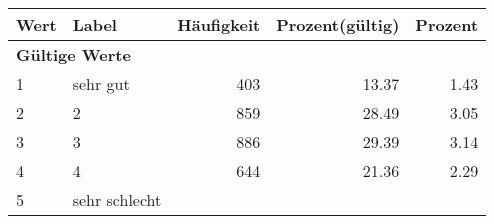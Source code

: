      \begin{longtable}{lXrrr}
     \toprule
     \textbf{Wert} & \textbf{Label} & \textbf{Häufigkeit} & \textbf{Prozent(gültig)} & \textbf{Prozent} \\
     \endhead
     \midrule
     \multicolumn{5}{l}{\textbf{Gültige Werte}}\\

     1 &
     \multicolumn{1}{X}{ sehr gut   } &


       \num{403} &
       \num[round-mode=places,round-precision=2]{13.37} &
         \num[round-mode=places,round-precision=2]{1.43} \\

     2 &
     \multicolumn{1}{X}{ 2   } &


       \num{859} &
       \num[round-mode=places,round-precision=2]{28.49} &
         \num[round-mode=places,round-precision=2]{3.05} \\

     3 &
     \multicolumn{1}{X}{ 3   } &


       \num{886} &
       \num[round-mode=places,round-precision=2]{29.39} &
         \num[round-mode=places,round-precision=2]{3.14} \\

     4 &
     \multicolumn{1}{X}{ 4   } &


       \num{644} &
       \num[round-mode=places,round-precision=2]{21.36} &
         \num[round-mode=places,round-precision=2]{2.29} \\

     5 &
     \multicolumn{1}{X}{ sehr schlecht   } &



\end{longtable}
